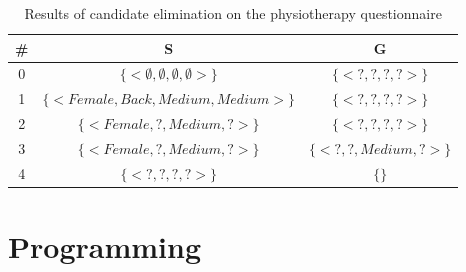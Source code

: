 \documentclass[a4paper]{article}
\begin{document}
\begin{enumerate}
        \begin{table}[ht]
            \begin{center}
            \begin{tabular}{|c|c|c|}
                \hline
                \# & S & G\\\hline
                0 & $\{<\emptyset, \emptyset, \emptyset, \emptyset>\}$ & $\{<?, ?, ?, ?>\}$\\\hline
                1 & $\{<Female, Back, Medium, Medium>\}$ & $\{<?, ?, ?, ?>\}$\\\hline
                2 & $\{<Female, ?, Medium, ?>\}$ & $\{<?, ?, ?, ?>\}$\\\hline
                3 & $\{<Female, ?, Medium, ?>\}$ & $\{<?, ?, Medium, ?>\}$\\\hline
                4 & $\{< ?, ?, ?, ?>\}$ & $\{\}$\\\hline
            \end{tabular}
            \caption{Results of candidate elimination on the physiotherapy questionnaire}
            \label{tab:candidate-results}
            \end{center}
        \end{table}

\end{enumerate}
\section{Programming}
\end{document}
